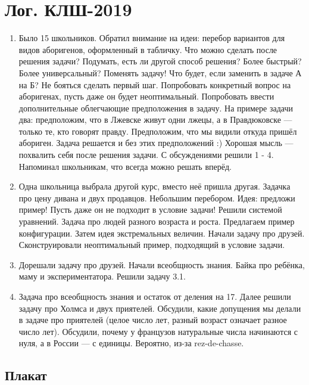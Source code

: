 \documentclass[12pt]{article}
\theoremstyle{definition}
\begin{document}
\newpage

\section{Лог. КЛШ-2019}

\begin{enumerate}
  \item Было 15 школьников. Обратил внимание на идеи: перебор вариантов для 
  видов аборигенов, оформленный в табличку. Что можно сделать после решения задачи?
  Подумать, есть ли другой способ решения? Более быстрый? Более универсальный?
  Поменять задачу! Что будет, если заменить в задаче А на Б? 
  Не бояться сделать первый шаг. Попробовать конкретный вопрос на аборигенах,
  пусть даже он будет неоптимальный. Попробовать ввести дополнительные облегчающие предположения в задачу.
  На примере задачи два: предположим, что в Лжевске живут одни лжецы, а в Правдюковске — только те, кто говорят правду. 
  Предположим, что мы видили откуда пришёл абориген. Задача решается и без этих предположений :)
  Хорошая мысль — похвалить себя после решения задачи. С обсуждениями решили 1 - 4. Напоминал школьникам, что всегда можно решать вперёд. 
  \item Одна школьница выбрала другой курс, вместо неё пришла другая. Задачка про цену дивана и двух продавцов. Небольшим перебором. Идея: предложи пример! Пусть даже он не подходит
  в условие задачи! Решили системой уравнений. 
  Задача про людей разного возраста и роста. Предлагаем пример конфигурации. Затем идея экстремальных величин.
  Начали задачу про друзей. Сконструировали неоптимальный пример, подходящий в условие задачи. 
  \item Дорешали задачу про друзей. Начали всеобщность знания. Байка про ребёнка, маму и экспериментатора. Решили задачу 3.1. 
  \item Задача про всеобщность знания и остаток от деления на 17. Далее решили задачу про Холмса и двух приятелей.
  Обсудили, какие допущения мы делали в задаче про приятелей (целое число лет, разный возраст означает разное число лет).
  Обсудили, почему у французов натуральные числа начинаются с нуля, а в России — с единицы. Вероятно, из-за rez-de-chasse. 

\end{enumerate}

\subsection{Плакат}
\end{document}
